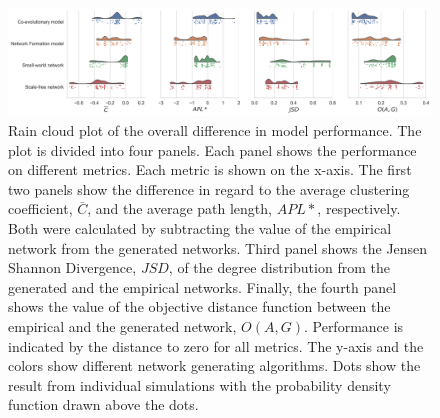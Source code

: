 \documentclass[11pt]{article}
\begin{document}
\begin{figure}[H]
    \centering
    \includegraphics[width=.9\linewidth]{../plots/overall/Model_Evaluation_Overview.png}
  \caption{Rain cloud plot of the overall difference in model performance. The plot is divided into four panels. Each panel shows the performance on different metrics. Each metric is shown on the x-axis. The first two panels show the difference in regard to the average clustering coefficient, $\overline{C}$, and the average path length, $APL*$, respectively. Both were calculated by subtracting the value of the empirical network from the generated networks. Third panel shows the Jensen Shannon Divergence, $JSD$, of the degree distribution from the generated and the empirical networks. Finally, the fourth panel shows the value of the objective distance function between the empirical and the generated network, $O(A,G)$. Performance is indicated by the distance to zero for all metrics. The y-axis and the colors show different network generating algorithms. Dots show the result from individual simulations with the probability density function drawn above the dots.}
  \label{fig:eval_overall}
\end{figure}
\end{document}
